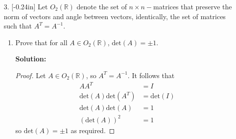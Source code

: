 \documentclass[letterpaper,12pt]{article}
\theoremstyle{definition}
\begin{document}
\begin{enumerate}
    \item[3.]\reversemarginpar{}[-0.24in] 
      Let $O_2(\mathbb{R})$ denote the set of $n \times n-$matrices that preserve the norm of vectors and angle between vectors, identically, the set of matrices such that $A^T = A^{-1}$. \begin{enumerate}
        \item Prove that for all $A \in O_2(\mathbb{R})$, $\mathrm{det}(A) = \pm 1$.
        \begin{mdframed}
            \textbf{Solution:} \begin{proof}
            Let $A \in O_2(\mathbb{R})$, so $A^T = A^{-1}$. It follows that \begin{align*}
            AA^T &= I \\
                \mathrm{det}(A)\mathrm{det}(A^T) &= \mathrm{det}(I) \\
                \mathrm{det}(A)\mathrm{det}(A)  &= 1 \\
               ( \mathrm{det}(A))^2 &= 1
            \end{align*}
            so $\mathrm{det}(A) = \pm 1$ as required.
            \end{proof}
        \end{mdframed}
    \end{enumerate}
\end{enumerate}
\pagebreak
\end{document}
